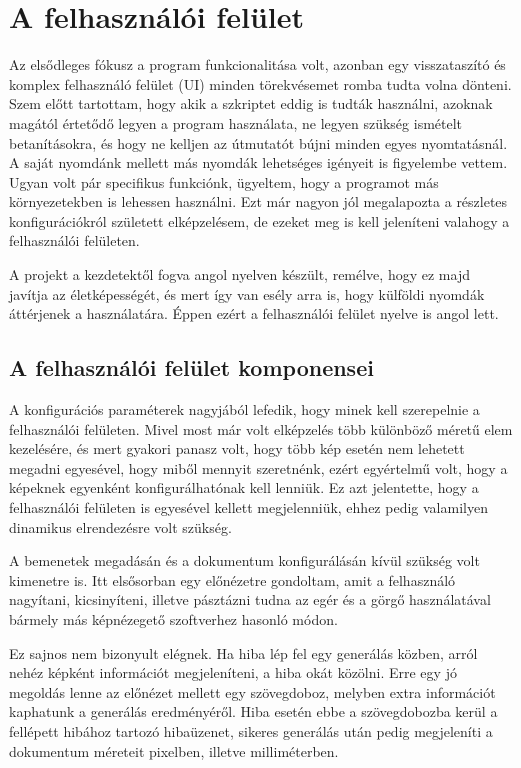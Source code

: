 \newpage
\section{A felhasználói felület}

Az elsődleges fókusz a program funkcionalitása volt, azonban egy visszataszító és komplex felhasználó felület (UI) minden törekvésemet romba tudta volna dönteni. Szem előtt tartottam, hogy akik a szkriptet eddig is tudták használni, azoknak magától értetődő legyen a program használata, ne legyen szükség ismételt betanításokra, és hogy ne kelljen az útmutatót bújni minden egyes nyomtatásnál. 
A saját nyomdánk mellett más nyomdák lehetséges igényeit is figyelembe vettem. 
Ugyan volt pár specifikus funkciónk, ügyeltem, hogy a programot más környezetekben is lehessen használni.
Ezt már nagyon jól megalapozta a részletes konfigurációkról született elképzelésem, de ezeket meg is kell jeleníteni valahogy a felhasználói felületen.

A projekt a kezdetektől fogva angol nyelven készült, remélve, hogy ez majd javítja az életképességét, és mert így van esély arra is, hogy külföldi nyomdák áttérjenek a használatára. Éppen ezért a felhasználói felület nyelve is angol lett.

\subsection{A felhasználói felület komponensei}

A konfigurációs paraméterek nagyjából lefedik, hogy minek kell szerepelnie a felhasználói felületen. 
Mivel most már volt elképzelés több különböző méretű elem kezelésére, és mert gyakori panasz volt, hogy több kép esetén nem lehetett megadni egyesével, hogy miből mennyit szeretnénk, ezért egyértelmű volt, hogy a képeknek egyenként konfigurálhatónak kell lenniük. Ez azt jelentette, hogy a felhasználói felületen is egyesével kellett megjelenniük, ehhez pedig valamilyen dinamikus elrendezésre volt szükség. 

A bemenetek megadásán és a dokumentum konfigurálásán kívül szükség volt kimenetre is. Itt elsősorban egy előnézetre gondoltam, amit a felhasználó nagyítani, kicsinyíteni, illetve pásztázni tudna az egér és a görgő használatával bármely más képnézegető szoftverhez hasonló módon.

Ez sajnos nem bizonyult elégnek. Ha hiba lép fel egy generálás közben, arról nehéz képként információt megjeleníteni, a hiba okát közölni. Erre egy jó megoldás lenne az előnézet mellett egy szövegdoboz, melyben extra információt kaphatunk a generálás eredményéről. Hiba esetén ebbe a szövegdobozba kerül a fellépett hibához tartozó hibaüzenet, sikeres generálás után pedig megjeleníti a dokumentum méreteit pixelben, illetve milliméterben. 

